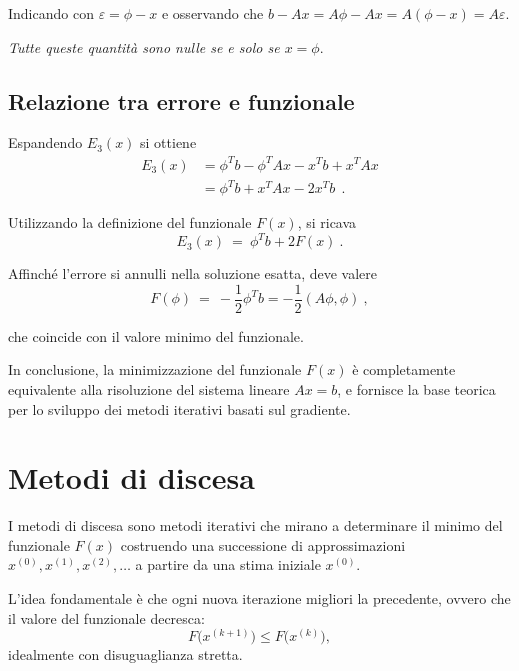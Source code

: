 Indicando con $\varepsilon = \phi - x$ e osservando che $b - Ax = A\phi - Ax = A(\phi - x) = A\varepsilon$.

\emph{Tutte queste quantità sono nulle se e solo se $x = \phi$}.

%
%
\subsection{Relazione tra errore e funzionale}

Espandendo $E_3(x)$ si ottiene
\begin{align*}
	E_3(x) &= \phi^T b - \phi^T A x - x^T b + x^T A x \\
	&= \phi^T b + x^T A x - 2 x^T b\ \ .
\end{align*}

Utilizzando la definizione del funzionale $F(x)$, si ricava
\begin{equation*}
	E_3(x)\ =\ \phi^T b + 2F(x)\ .
\end{equation*}

Affinché l'errore si annulli nella soluzione esatta, deve valere
\begin{equation*}
	F(\phi)\ =\ -\frac{1}{2}\phi^T b = -\frac{1}{2}(A\phi, \phi)\ ,
\end{equation*}

che coincide con il valore minimo del funzionale.

\bigskip

In conclusione, la minimizzazione del funzionale $F(x)$ è completamente equivalente alla risoluzione del sistema lineare $Ax = b$, e fornisce la base teorica per lo sviluppo dei metodi iterativi basati sul gradiente.


\section{Metodi di discesa}

I metodi di discesa sono metodi iterativi che mirano a determinare il minimo del funzionale $F(x)$ costruendo una successione di approssimazioni $x^{(0)}, x^{(1)}, x^{(2)}, \dots$ a partire da una stima iniziale $x^{(0)}$.

L'idea fondamentale è che ogni nuova iterazione migliori la precedente, ovvero che il valore del funzionale decresca:
\begin{equation*}
	F\big(x^{(k+1)}\big) \leq F\big(x^{(k)}\big),
\end{equation*}
idealmente con disuguaglianza stretta.

